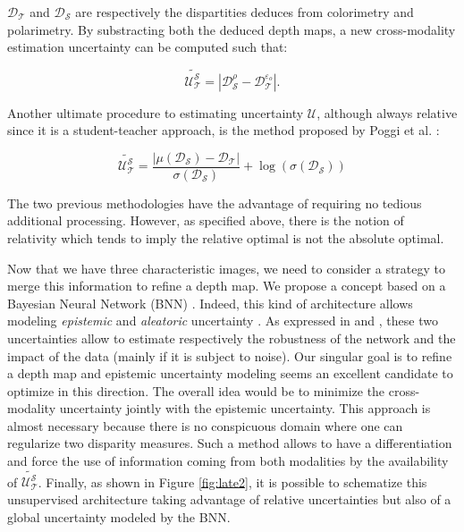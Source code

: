 $\mathcal{D}_{\mathcal{T}}$ and $\mathcal{D}_{\mathcal{S}}$ are respectively the dispartities deduces from colorimetry and polarimetry. By substracting both the deduced depth maps, a new cross-modality estimation uncertainty can be computed such that:

\begin{equation}
	\widetilde{\mathcal{U}_{\mathcal{T}}^{\mathcal{S}}} = |\mathcal{D}_{\mathcal{S}}^{\rho} - \mathcal{D}_{\mathcal{T}}^{\varepsilon_o} |.
\end{equation}


Another ultimate procedure to estimating uncertainty $\mathcal{U}$, although always relative since it is a student-teacher approach, is the method proposed by Poggi et al. \cite{poggi2020uncertainty}:

\begin{equation}
\widetilde{\mathcal{U}_{\mathcal{T}}^{\mathcal{S}}} = \frac{|\mu(\mathcal{D}_\mathcal{S}) - \mathcal{D}_\mathcal{T}|}{\sigma(\mathcal{D}_\mathcal{S})} + \log (\sigma(\mathcal{D}_\mathcal{S}))
\end{equation}

The two previous methodologies have the advantage of requiring no tedious additional processing. However, as specified above, there is the notion of relativity which tends to imply the relative optimal is not the absolute optimal.

Now that we have three characteristic images, we need to consider a strategy to merge this information to refine a depth map.
We propose a concept based on a Bayesian Neural Network (BNN) \cite{denker1990transforming,mackay1992practical}. Indeed, this kind of architecture allows modeling \emph{epistemic} and \emph{aleatoric} uncertainty \cite{der2009aleatory}. As expressed in \cite{kendall2015bayesian,kendall2016modelling} and \cite{kendall2017uncertainties}, these two uncertainties allow to estimate respectively the robustness of the network and the impact of the data (mainly if it is subject to noise).
Our singular goal is to refine a depth map and epistemic uncertainty modeling seems an excellent candidate to optimize in this direction. 
The overall idea would be to minimize the cross-modality uncertainty jointly with the epistemic uncertainty.
This approach is almost necessary because there is no conspicuous domain where one can regularize two disparity measures. Such a method allows to have a differentiation and force the use of information coming from both modalities by the availability of $\widetilde{\mathcal{U}_{\mathcal{T}}^{\mathcal{S}}}$.
Finally, as shown in Figure \ref{fig:late2}, it is possible to schematize this unsupervised architecture taking advantage of relative uncertainties but also of a global uncertainty modeled by the BNN. 

